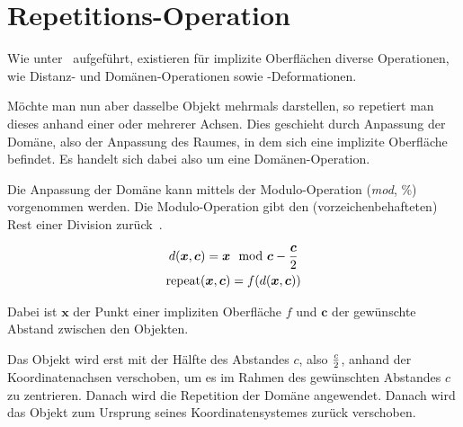 
\section{Repetitions-Operation}
\label{sec:rendering:modulo}

Wie unter~\cite[S. 37ff]{osterwalder_sven_volume_2016} aufgeführt, existieren
für implizite Oberflächen diverse Operationen, wie Distanz- und
Domänen-Operationen sowie -Deformationen.

Möchte man nun aber dasselbe Objekt mehrmals darstellen, so repetiert man
dieses anhand einer oder mehrerer Achsen. Dies geschieht durch Anpassung der
Domäne, also der Anpassung des Raumes, in dem sich eine implizite Oberfläche
befindet. Es handelt sich dabei also um eine Domänen-Operation.

Die Anpassung der Domäne kann mittels der Modulo-Operation (\textit{mod}, \%)
vorgenommen werden. Die Modulo-Operation gibt den (vorzeichenbehafteten) Rest
einer Division zurück~\cite{maignan_integer_2008}.

\begin{gather}
    d(\bm{x}, \bm{c}) = \bm{x} \mod \bm{c} - {\bm{c} \over 2}\\
    \text{repeat}(\bm{x}, \bm{c}) = f(d(\bm{x}, \bm{c}))
\end{gather}

Dabei ist $\bm{x}$ der Punkt einer impliziten Oberfläche $f$ und $\bm{c}$ der
gewünschte Abstand zwischen den Objekten.

Das Objekt wird erst mit der Hälfte des Abstandes $c$, also $c \over 2$, anhand
der Koordinatenachsen verschoben, um es im Rahmen des gewünschten Abstandes
$c$ zu zentrieren.  Danach wird die Repetition der Domäne angewendet. Danach
wird das Objekt zum Ursprung seines Koordinatensystemes zurück verschoben.
